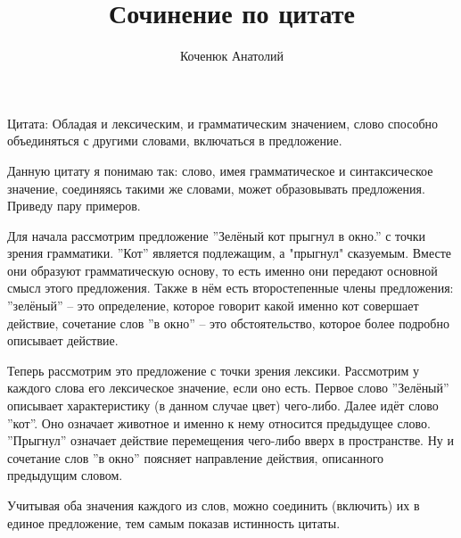 \documentclass[12pt,a4paper]{article}
\author{Коченюк Анатолий}
\title{Сочинение по цитате}
\begin{document}
 \maketitle
 
 Цитата: Обладая и лексическим, и грамматическим значением, слово способно объединяться с другими словами, включаться в предложение.
 \newline
 
 Данную цитату я понимаю так: слово, имея грамматическое и синтаксическое значение, соединяясь такими же словами, может образовывать предложения. Приведу пару примеров.
 
 Для начала рассмотрим предложение ''Зелёный кот прыгнул в окно.'' с точки зрения грамматики. ''Кот'' является подлежащим, а "прыгнул" сказуемым. Вместе они образуют грамматическую основу, то есть именно они передают основной смысл этого предложения. Также в нём есть второстепенные члены предложения: ''зелёный'' -- это определение, которое говорит какой именно кот совершает действие, сочетание слов ''в окно'' -- это обстоятельство, которое более подробно описывает действие. 
 
Теперь рассмотрим это предложение с точки зрения лексики. Рассмотрим у каждого слова его лексическое значение, если оно есть. Первое слово ''Зелёный'' описывает характеристику (в данном случае цвет) чего-либо. Далее идёт слово ''кот''. Оно означает животное и именно к нему относится предыдущее слово. ''Прыгнул'' означает действие перемещения чего-либо вверх в пространстве.
Ну и сочетание слов ''в окно'' поясняет направление действия, описанного предыдущим словом. 
 
 Учитывая оба значения каждого из слов, можно соединить (включить) их в единое предложение, тем самым показав истинность цитаты. 
 
 
\end{document}
